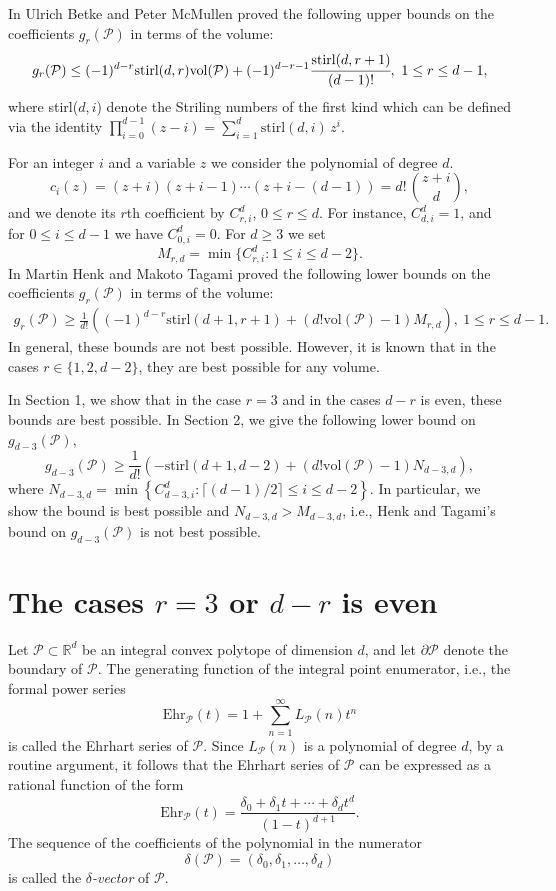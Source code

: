 \documentclass[12pt]{amsart}
\theoremstyle{definition}
\theoremstyle{remark}
\numberwithin{equation}{section}
\def\Pc{{\mathcal P}}
\def\NZQ{\mathbb}               %
\def\RR{{\NZQ R}}
\begin{document}
 In \cite[Theorem 6]{upper} Ulrich Betke and Peter McMullen proved the following upper bounds on the coefficients $g_r(\Pc)$ in terms of the volume:
 $$g_r(\Pc) \leq (-1)^{d-r}\text{stirl}(d,r)\text{vol}(\Pc)+(-1)^{d-r-1}\cfrac{\text{stirl}(d,r+1)}{(d-1)!}, \  1\leq r \leq d-1,$$
 where stirl($d,i$) denote the Striling numbers of the first kind which can be defined via the identity $\prod_{i=0}^{d-1} (z-i)=\sum_{i=1}^d \text{stirl}(d,i)\,z^i$.
 
 For an integer $i$ and a variable $z$ we consider  the polynomial of degree $d$.
$$ c_i(z)=(z+i)(z+i-1)\cdots(z+i-(d-1))=d!\,\binom{z+i}{d},    $$
 and we denote its $r$th coefficient by $C^d_{r,i}$, $0\leq r\leq d$.
 For instance, $C_{d,i}^d=1$, and for $0\leq i\leq d-1$ we have
 $C_{0,i}^d=0$. For $d\geq 3$ we set  
$$ M_{r,d}=\min\{C_{r,i}^d : 1\leq i\leq d-2\}. $$
In \cite[Theorem 1.1]{lower} Martin Henk and Makoto Tagami proved the following lower bounds on the coefficients $g_r(\Pc)$ in terms of the volume:
\begin{align}
g_r(\Pc) \geq \frac{1}{d!}\left((-1)^{d-r}\text{stirl}(d+1,r+1)+(d!\text{vol}(\Pc)-1)M_{r,d}\right), \  1\leq r \leq d-1.
\end{align}
 	 In general, these bounds  are not best possible.
 	 However, it is known that in the cases $r \in \{1,2,d-2\}$, they are best possible for any volume.
 	
 	 In Section 1, we show that in the case $r=3$ and in the cases $d-r$ is even, these bounds are best possible. 
	 In Section 2, we give the following lower bound on $g_{d-3}(\Pc)$,
 	$$ g_{d-3}(\Pc) \geq \frac{1}{d!}\left(-\text{stirl}(d+1,d-2)+(d!\text{vol}(\Pc)-1)N_{d-3,d}\right),$$
 	where $N_{d-3,d}=\min\left\{C^d_{d-3,i}:\lceil (d-1)/2 \rceil \leq i \leq d-2 \right\}.$
 	 In particular, we show the bound is best possible and $N_{d-3,d} > M_{d-3,d}$, i.e., Henk and Tagami's bound on $g_{d-3}(\Pc)$ is not best possible. 
 	 
 	 
 	 
	
	\section{The cases $r=3$ or $d-r$ is even }
Let $\Pc \subset \RR^d$ be an integral convex polytope of dimension $d$, and let $\partial \Pc$ denote the boundary of $\Pc$.
The generating function of the integral point enumerator, i.e., the formal power series
$$\text{Ehr}_\Pc(t)=1+\sum\limits_{n=1}^{\infty}L_\Pc(n)t^n$$
is called the Ehrhart series of $\Pc$.
Since $L_\Pc(n)$ is a polynomial of degree $d$, by a routine argument, it follows that the Ehrhart series of $\Pc$ can be expressed as a rational function of the form
$$\text{Ehr}_\Pc(t)=\frac{\delta_0+\delta_1t+\cdots + \delta_dt^d}{(1-t)^{d+1}}.$$
The sequence of the coefficients of the polynomial in the numerator 
$$\delta(\Pc)=(\delta_0,\delta_1,\ldots,\delta_d)$$
is called the \textit{$\delta$-vector} of $\Pc$.
\end{document}
